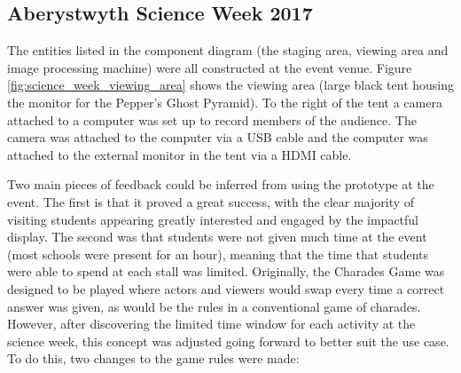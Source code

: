 \subsection{Aberystwyth Science Week 2017}

\begin{figure}[h!]
\end{figure}


The entities listed in the component diagram (the staging area, viewing area and image processing machine) were all constructed at the event venue. Figure \ref{fig:science_week_viewing_area} shows the viewing area (large black tent housing the monitor for the Pepper's Ghost Pyramid). To the right of the tent a camera attached to a computer was set up to record members of the audience. The camera was attached to the computer via a USB cable and the computer was attached to the external monitor in the tent via a HDMI cable.

Two main pieces of feedback could be inferred from using the prototype at the event. The first is that it proved a great success, with the clear majority of visiting students appearing greatly interested and engaged by the impactful display. The second was that students were not given much time at the event (most schools were present for an hour), meaning that the time that students were able to spend at each stall was limited. Originally, the Charades Game was designed to be played where actors and viewers would swap every time a correct answer was given, as would be the rules in a conventional game of charades. However, after discovering the limited time window for each activity at the science week, this concept was adjusted going forward to better suit the use case. To do this, two changes to the game rules were made:

